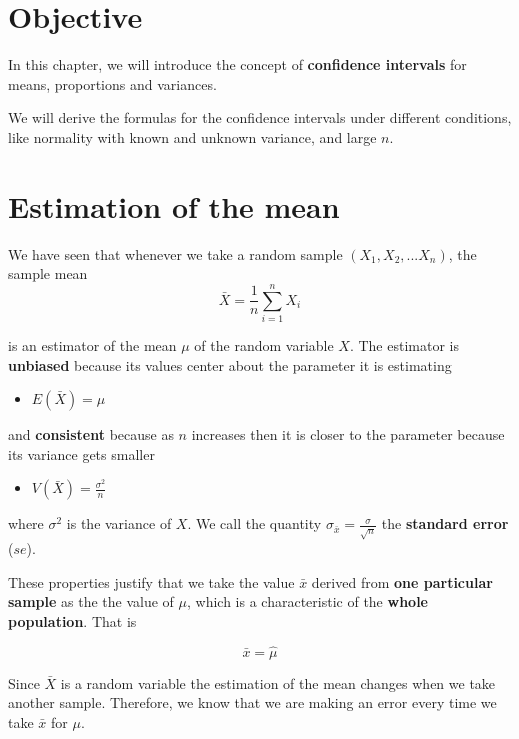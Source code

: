 \documentclass[
]{book}
\providecommand{\tightlist}{%
  \setlength{\itemsep}{0pt}\setlength{\parskip}{0pt}}
\begin{document}
\hypertarget{objective-9}{%
\section{Objective}\label{objective-9}}

In this chapter, we will introduce the concept of \textbf{confidence intervals} for means, proportions and variances.

We will derive the formulas for the confidence intervals under different conditions, like normality with known and unknown variance, and large \(n\).

\hypertarget{estimation-of-the-mean}{%
\section{Estimation of the mean}\label{estimation-of-the-mean}}

We have seen that whenever we take a random sample \((X_1, X_2, ... X_n)\), the sample mean
\[\bar{X}=\frac{1}{n}\sum_{i=1}^n X_i\]

is an estimator of the mean \(\mu\) of the random variable \(X\). The estimator is \textbf{unbiased} because its values center about the parameter it is estimating

\begin{itemize}
\tightlist
\item
  \(E(\bar{X})=\mu\)
\end{itemize}

and \textbf{consistent} because as \(n\) increases then it is closer to the parameter because its variance gets smaller

\begin{itemize}
\tightlist
\item
  \(V(\bar{X})=\frac{\sigma^2}{n}\)
\end{itemize}

where \(\sigma^2\) is the variance of \(X\). We call the quantity \(\sigma_{\bar{x}}=\frac{\sigma}{\sqrt{n}}\) the \textbf{standard error} (\(se\)).

These properties justify that we take the value \(\bar{x}\) derived from \textbf{one particular sample} as the the value of \(\mu\), which is a characteristic of the \textbf{whole population}. That is

\[\bar{x}=\hat{\mu}\]

Since \(\bar{X}\) is a random variable the estimation of the mean changes when we take another sample. Therefore, we know that we are making an error every time we take \(\bar{x}\) for \(\mu\).
\end{document}
